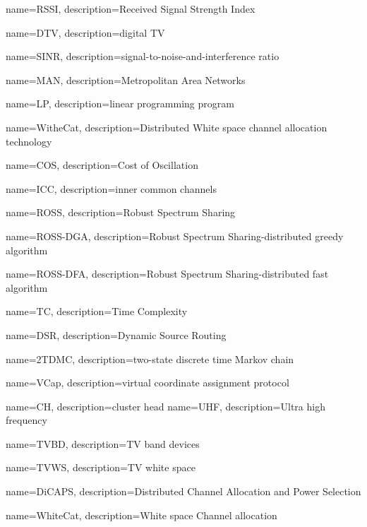 {
    name=RSSI,
    description={Received Signal Strength Index}
}


{
    name=DTV,
    description={digital TV}
}

{
    name=SINR,
    description={signal-to-noise-and-interference ratio}
}

{
    name=MAN,
    description={Metropolitan Area Networks}
}

{
    name=LP,
    description={linear programming program}
}

{
    name=WitheCat,
    description={Distributed White space channel allocation technology}
}

{
    name=COS,
    description={Cost of Oscillation}
}

{
    name=ICC,
    description={inner common channels}
}

{
    name=ROSS,
    description={Robust Spectrum Sharing}
}

{
    name=ROSS-DGA,
    description={Robust Spectrum Sharing-distributed greedy algorithm}
}

{
    name=ROSS-DFA,
    description={Robust Spectrum Sharing-distributed fast algorithm}
}


{
    name=TC,
    description={Time Complexity}
}

{
    name=DSR,
    description={Dynamic Source Routing}
}

{
    name=2TDMC,
    description={two-state discrete time Markov chain}
}

{
    name=VCap,
    description={virtual coordinate assignment protocol}
}


{
    name=CH,
    description={cluster head}
}
{
    name=UHF,
    description={Ultra high frequency}
}


{
    name=TVBD,
    description={TV band devices}
}

{
    name=TVWS,
    description={TV white space}
}

{
    name=DiCAPS,
    description={Distributed Channel Allocation and Power Selection}
}

{
    name=WhiteCat,
    description={White space Channel allocation}
}
